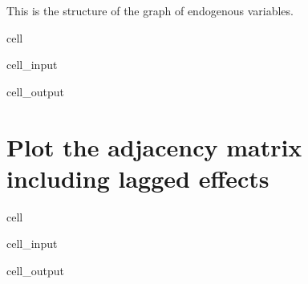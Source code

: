 \documentclass[letterpaper,10pt,english]{jupyterBook}
\begin{document}
\sphinxAtStartPar
This is the structure of the graph of  endogenous variables.

\begin{sphinxuseclass}{cell}\begin{sphinxVerbatimInput}

\begin{sphinxuseclass}{cell_input}
\begin{sphinxVerbatim}[commandchars=\\\{\}]
\end{sphinxVerbatim}

\end{sphinxuseclass}\end{sphinxVerbatimInput}
\begin{sphinxVerbatimOutput}

\begin{sphinxuseclass}{cell_output}
\noindent{}

\end{sphinxuseclass}\end{sphinxVerbatimOutput}

\end{sphinxuseclass}

\section{Plot the adjacency matrix including lagged effects}
\label{\detokenize{content/howto/structure/Logical_structure:plot-the-adjacency-matrix-including-lagged-effects}}
\begin{sphinxuseclass}{cell}\begin{sphinxVerbatimInput}

\begin{sphinxuseclass}{cell_input}
\begin{sphinxVerbatim}[commandchars=\\\{\}]
\end{sphinxVerbatim}

\end{sphinxuseclass}\end{sphinxVerbatimInput}
\begin{sphinxVerbatimOutput}

\begin{sphinxuseclass}{cell_output}
\noindent{}

\end{sphinxuseclass}\end{sphinxVerbatimOutput}

\end{sphinxuseclass}
\sphinxstepscope
\end{document}
